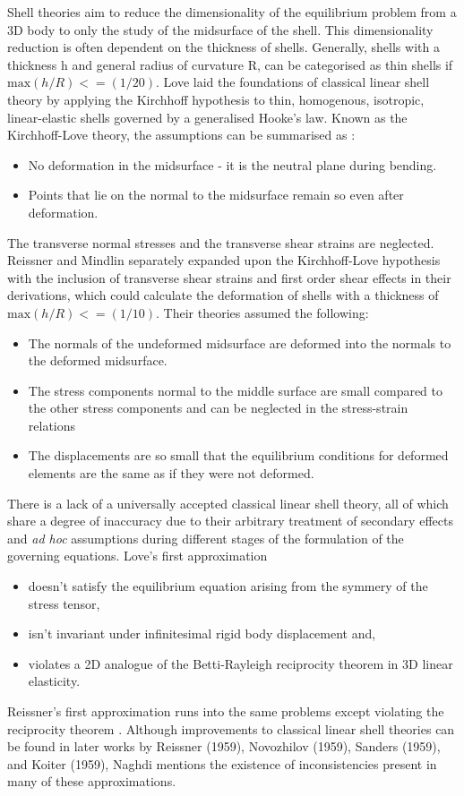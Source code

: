 Shell theories aim to reduce the dimensionality of the equilibrium problem from a 3D body to only the study of the
 midsurface of the shell. This dimensionality reduction is often dependent on the thickness of shells. Generally, shells
 with a thickness h and general radius of curvature R, can be categorised as thin shells if $\text{max}(h/R)<=(1/20)$.
Love laid the foundations of classical linear shell theory by applying the Kirchhoff hypothesis to thin,
 homogenous, isotropic, linear-elastic shells governed by a generalised Hooke's law. Known as the Kirchhoff-Love theory,
 the assumptions can be summarised as \cite{podio1989}:
\begin{itemize}
    \item No deformation in the midsurface - it is the neutral plane during bending.
    \item Points that lie on the normal to the midsurface remain so even after deformation.
\end{itemize}
The transverse normal stresses and the transverse shear strains are neglected. 
Reissner \cite{reissner1941} and Mindlin \cite{mindlin1951} separately expanded upon the Kirchhoff-Love hypothesis with the inclusion of transverse shear
strains and first order shear effects in their derivations, which could calculate the deformation of shells with a
thickness of $\text{max}(h/R) <= (1/10)$. Their theories assumed the following:
\begin{itemize}
    \item The normals of the undeformed midsurface are deformed into the normals to the deformed midsurface.
    \item The stress components normal to the middle surface are small compared to the other stress components and can be neglected in the stress-strain relations
    \item The displacements are so small that the equilibrium conditions for deformed elements are the same as if they were not deformed.
\end{itemize}
There is a lack of a universally accepted classical linear shell theory, all of which share a degree of inaccuracy
 due to their arbitrary treatment of secondary effects \cite{nayfeh2004} and \emph{ad hoc} assumptions \cite{naghdi1963}
 during different stages of the formulation of the governing equations. Love's first
 approximation
 \begin{itemize}
    \item doesn't satisfy the equilibrium equation arising from the symmery of the stress tensor,
    \item isn't invariant under infinitesimal rigid body displacement and,
    \item violates a 2D analogue of the Betti-Rayleigh reciprocity theorem in 3D linear elasticity.
\end{itemize}
Reissner's first approximation runs into the same problems except violating the reciprocity theorem \cite{truesdell1984}. Although improvements to classical linear
 shell theories can be found in later works by Reissner (1959), Novozhilov (1959), Sanders (1959), and Koiter
 (1959), Naghdi \cite{naghdi1963} mentions the existence of inconsistencies present in many of these approximations. 

